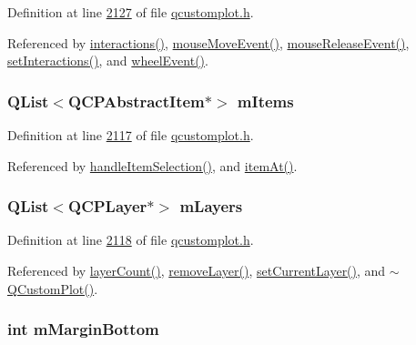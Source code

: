 Definition at line \hyperlink{a00116_source_l02127}{2127} of file \hyperlink{a00116_source}{qcustomplot.\+h}.



Referenced by \hyperlink{a00116_source_l01975}{interactions()}, \hyperlink{a00115_source_l07639}{mouse\+Move\+Event()}, \hyperlink{a00115_source_l07691}{mouse\+Release\+Event()}, \hyperlink{a00115_source_l06319}{set\+Interactions()}, and \hyperlink{a00115_source_l07811}{wheel\+Event()}.

\hypertarget{a00116_a6fcfff6ea3ccabcac8818943adb79a72}{
\subsubsection[{m\+Items}]{\setlength{\rightskip}{0pt plus 5cm}Q\+List$<${\bf Q\+C\+P\+Abstract\+Item}$\ast$$>$ m\+Items}}\label{a00116_a6fcfff6ea3ccabcac8818943adb79a72}


Definition at line \hyperlink{a00116_source_l02117}{2117} of file \hyperlink{a00116_source}{qcustomplot.\+h}.



Referenced by \hyperlink{a00115_source_l07917}{handle\+Item\+Selection()}, and \hyperlink{a00115_source_l06924}{item\+At()}.

\hypertarget{a00116_ae46b0ffefe1087007ffb11398a18a20e}{
\subsubsection[{m\+Layers}]{\setlength{\rightskip}{0pt plus 5cm}Q\+List$<${\bf Q\+C\+P\+Layer}$\ast$$>$ m\+Layers}}\label{a00116_ae46b0ffefe1087007ffb11398a18a20e}


Definition at line \hyperlink{a00116_source_l02118}{2118} of file \hyperlink{a00116_source}{qcustomplot.\+h}.



Referenced by \hyperlink{a00115_source_l07035}{layer\+Count()}, \hyperlink{a00115_source_l07087}{remove\+Layer()}, \hyperlink{a00115_source_l07018}{set\+Current\+Layer()}, and \hyperlink{a00115_source_l05836}{$\sim$\+Q\+Custom\+Plot()}.

\hypertarget{a00116_ad02e2d81ae66d4261d1e46a6979ea118}{
\subsubsection[{m\+Margin\+Bottom}]{\setlength{\rightskip}{0pt plus 5cm}int m\+Margin\+Bottom}}\label{a00116_ad02e2d81ae66d4261d1e46a6979ea118}


